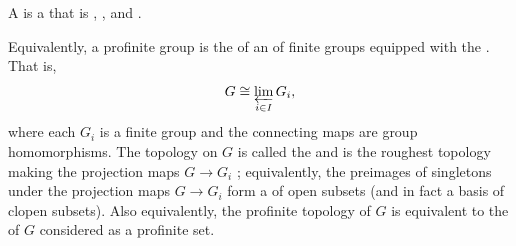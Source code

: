 \begin{definition} \label{definition:profinite_group}
A  is a  that is , , and .

Equivalently, a profinite group is the  of an  of finite groups equipped with the . That is,
$$ G \cong \varprojlim_{i \in I} G_{i}, $$
where each $G_{i}$ is a finite group and the connecting maps are group homomorphisms. The topology on $G$ is called the  and is the roughest topology making the projection maps $G \to G_{i}$ ; equivalently, the preimages of singletons under the projection maps $G \to G_i$ form a  of open subsets (and in fact a basis of clopen subsets). Also equivalently, the profinite topology of $G$ is equivalent to the  of $G$ considered as a profinite set.
\end{definition}
